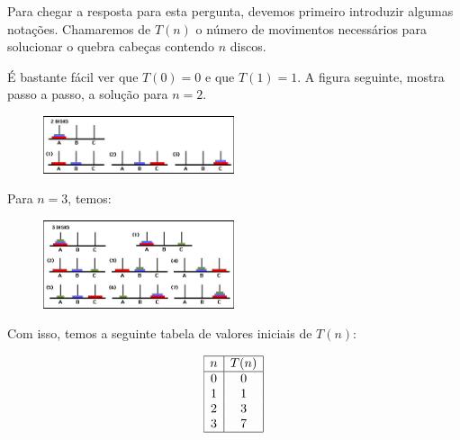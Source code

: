 Para chegar a resposta para esta pergunta, devemos primeiro introduzir
algumas notações. Chamaremos de $T(n)$ o número de movimentos
necessários para solucionar o quebra cabeças contendo $n$ discos.

É bastante fácil ver que $T(0) = 0$ e que $T(1) = 1$. A figura
seguinte, mostra passo a passo, a solução para $n = 2$.\\

\begin{figure}[H]
  \centering
      \includegraphics[width=0.5\textwidth]{imagens/hanoi2.jpg}
 \end{figure}

Para $n = 3$, temos: \\

\begin{figure}[h!]
  \centering
      \includegraphics[width=0.5\textwidth]{imagens/hanoi3.jpg}
 \end{figure}

Com isso, temos a seguinte tabela de valores iniciais de $T(n)$:

\[
\begin{array}{|c|c|}
  \hline
  n & T(n)\\ \hline
  0  & 0 \\
  1  & 1 \\
  2 & 3 \\
  3 & 7\\
  \hline
\end{array}
\]


